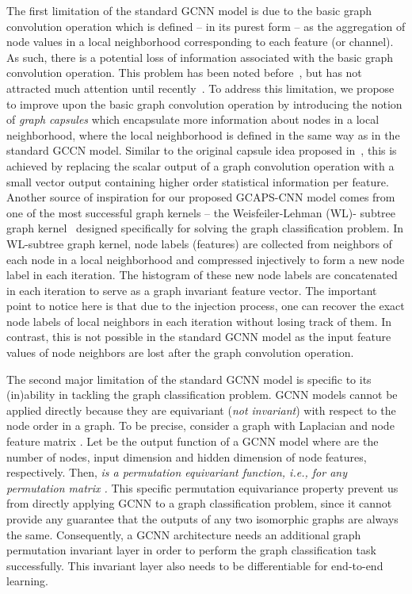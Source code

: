 \documentclass{article}
\begin{document}
 The first limitation of the standard GCNN model  is due to the basic graph convolution operation which is defined -- in its purest form -- as the aggregation of node values in a local neighborhood corresponding to each feature (or channel). As such,  there is a potential loss of information associated with  the basic graph convolution operation.  
This problem has been noted  before~\cite{hinton2011transforming}, but has not attracted much attention  until recently~\cite{sabour2017dynamic}. To address this limitation, we  propose to improve upon the basic graph convolution operation by introducing the notion of {\em graph capsules} which encapsulate more information about nodes in a local neighborhood, where the local neighborhood is defined in the same way as in the standard GCCN model. Similar to the original capsule idea proposed in~\cite{hinton2011transforming}, this is achieved by replacing the scalar output  of a graph convolution operation  with a small vector output containing higher order statistical information per feature. Another source of inspiration for our proposed GCAPS-CNN model comes from one of the most successful graph kernels -- the Weisfeiler-Lehman (WL)- subtree graph kernel~\cite{shervashidze2011weisfeiler} designed specifically for solving the graph classification problem.
 In WL-subtree graph kernel, node labels  (features) are collected from neighbors of each node in a local neighborhood  and  compressed injectively to form a new node label in each iteration. The histogram of these new node labels are concatenated in each iteration to serve  as a  graph invariant feature vector. The important point to notice here  is that  due to the injection process, one can recover  the exact node labels of local neighbors in each iteration without losing  track of them. In contrast, this is not possible in the standard GCNN model as the   input feature values of node neighbors are lost  after the graph convolution operation.

The second major limitation of the standard GCNN model is specific to its (in)ability in tackling the graph classification problem.  GCNN models cannot be applied   directly   because they are equivariant  ({\em not invariant}) with respect to the node order in a graph. To be precise, consider a graph   with Laplacian     and node feature matrix . Let  be the output function of a GCNN model where  are the number of nodes, input dimension and  hidden dimension of node features, respectively.  Then,
\textit{ is a permutation equivariant function, i.e., for any    permutation matrix . }
This specific permutation equivariance property prevent us from directly applying GCNN to a graph classification problem, since it cannot provide any guarantee that the outputs of  any two isomorphic graphs are always the same. Consequently,  a GCNN architecture needs an additional graph permutation invariant layer in order to perform the  graph classification task successfully. This invariant layer  also   needs to be differentiable  for end-to-end learning.
\end{document}
